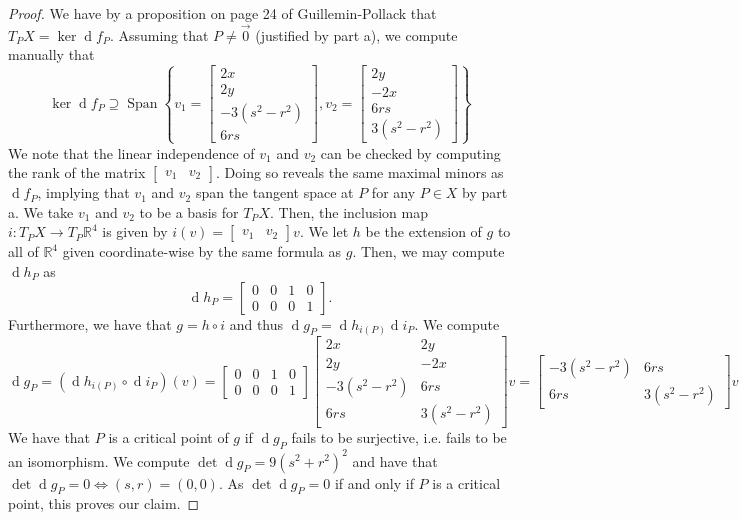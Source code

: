 \documentclass[english]{article}
\let\avec=\vec
\renewcommand\vec{\mathbf}
\renewcommand{\d}[1]{\ensuremath{\operatorname{d}\!{#1}}}
\newcommand{\RR}{\mathbb{R}}
\theoremstyle{remark}
\theoremstyle{definition}
\DeclareMathOperator{\spn}{Span}
\begin{document}
\begin{proof}
	We have by a proposition on page 24 of Guillemin-Pollack that $T_PX=\ker \d f_P$. Assuming that $P\neq \avec{0}$ (justified by part a), we compute manually that 
	\[\ker \d f_P\supseteq \spn\left\{v_1=\begin{bmatrix}
	2x\\2y\\-3(s^2-r^2)\\6rs
	\end{bmatrix},v_2=\begin{bmatrix}
	2y\\-2x\\6rs\\3(s^2-r^2)
	\end{bmatrix}\right\}\]
	We note that the linear independence of $v_1$ and $v_2$ can be checked by computing the rank of the matrix $\begin{bmatrix} v_1&v_2\end{bmatrix}$. Doing so reveals the same maximal minors as $\d f_P$, implying that $v_1$ and $v_2$ span the tangent space at $P$ for any $P\in X$ by part a. We take $v_1$ and $v_2$ to be a basis for $T_PX$. Then, the inclusion map $i:T_PX\to T_P\RR^4$ is given by $i(v)=\begin{bmatrix}
	v_1&v_2
	\end{bmatrix}v$. We let $h$ be the extension of $g$ to all of $\RR^4$ given coordinate-wise by the same formula as $g$. Then, we may compute $\d h_P$ as \[\d h_P=\begin{bmatrix}
	0&0&1&0\\0&0&0&1
	\end{bmatrix}. \] Furthermore, we have that $g=h\circ i$ and thus $\d g_P=\d h_{i(P)}\d i_P$. We compute \[\d g_P=(\d h_{i(P)}\circ\d i_P)(v)=\begin{bmatrix}
	0&0&1&0\\0&0&0&1
	\end{bmatrix}\begin{bmatrix}
	2x&2y\\2y&-2x\\-3(s^2-r^2)&6rs\\6rs&3(s^2-r^2)
	\end{bmatrix}v=\begin{bmatrix}
	-3(s^2-r^2)&6rs\\6rs&3(s^2-r^2)
	\end{bmatrix}v \]
	We have that $P$ is a critical point of $g$ if $\d g_P$ fails to be surjective, i.e. fails to be an isomorphism. We compute $\det \d g_P=9(s^2+r^2)^2$ and have that $\det \d g_P=0\iff (s,r)=(0,0)$. As $\det \d g_P=0$ if and only if $P$ is a critical point, this proves our claim.
\end{proof}
\end{document}
